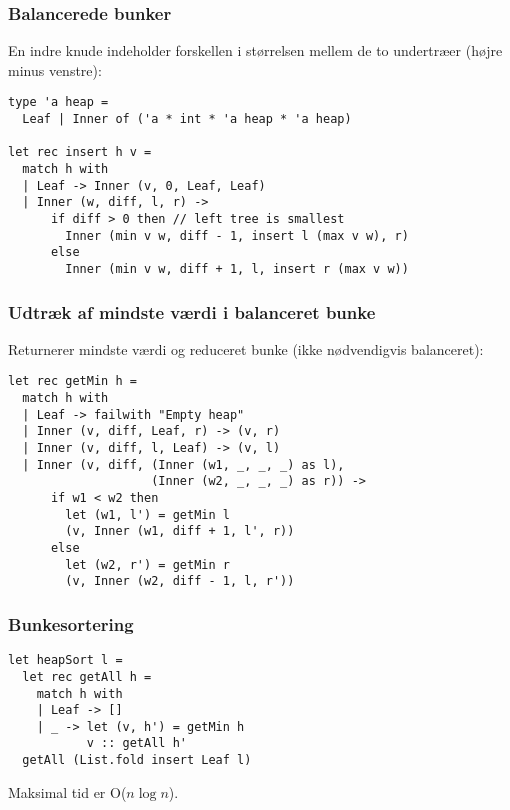 \documentclass{beamer}
\begin{document}
\begin{frame}[fragile=singleslide]
\frametitle{Balancerede bunker}

En indre knude indeholder forskellen i størrelsen mellem de to
undertræer (højre minus venstre):

\renewcommand{\baselinestretch}{0.9}
\begin{verbatim}
type 'a heap =
  Leaf | Inner of ('a * int * 'a heap * 'a heap)

let rec insert h v =
  match h with
  | Leaf -> Inner (v, 0, Leaf, Leaf)
  | Inner (w, diff, l, r) ->
      if diff > 0 then // left tree is smallest
        Inner (min v w, diff - 1, insert l (max v w), r)
      else
        Inner (min v w, diff + 1, l, insert r (max v w))
\end{verbatim}

\end{frame}

\begin{frame}[fragile=singleslide]
\frametitle{Udtræk af mindste værdi i balanceret bunke}

Returnerer mindste værdi og reduceret bunke (ikke nødvendigvis balanceret):

\renewcommand{\baselinestretch}{0.9}
{\small
\begin{verbatim}
let rec getMin h =
  match h with
  | Leaf -> failwith "Empty heap"
  | Inner (v, diff, Leaf, r) -> (v, r)
  | Inner (v, diff, l, Leaf) -> (v, l)
  | Inner (v, diff, (Inner (w1, _, _, _) as l),
                    (Inner (w2, _, _, _) as r)) ->
      if w1 < w2 then
        let (w1, l') = getMin l
        (v, Inner (w1, diff + 1, l', r))
      else
        let (w2, r') = getMin r
        (v, Inner (w2, diff - 1, l, r'))
\end{verbatim}
}

\end{frame}

\begin{frame}[fragile=singleslide]
\frametitle{Bunkesortering}


\renewcommand{\baselinestretch}{0.9}
\begin{verbatim}
let heapSort l =
  let rec getAll h =
    match h with
    | Leaf -> []
    | _ -> let (v, h') = getMin h
           v :: getAll h'
  getAll (List.fold insert Leaf l)
\end{verbatim}

Maksimal tid er O($n \log n$).

\end{frame}
\end{document}
